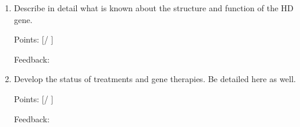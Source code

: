 \documentclass[basic]{inVerba-notes}
\begin{document}
{\begin{enumerate}
\begin{enumerate}
    \basec{-----}

    Points: [\qquad / \qquad ]

    Feedback: 

    \vspace*{40pt}
    \item Describe in detail what is known about the structure and function of the HD gene.
    
    \basec{-----}

    Points: [\qquad / \qquad ]

    Feedback: 

    \vspace*{40pt}
    \item Develop the status of treatments and gene therapies. Be detailed here as well.
    
    \basec{-----}

    Points: [\qquad / \qquad ]

    Feedback: 

    \vspace*{40pt}
  \end{enumerate}

 \end{enumerate}}


\nocite*{}


\end{document}
